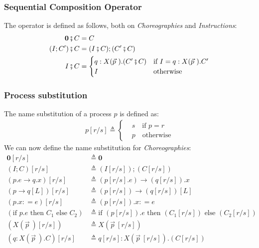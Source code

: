 \documentclass[12pt,a4paper,twoside]{book}
\newcommand{\metaDef}{\mathrel{\mathop:}=}
\newcommand{\gencom}{p.e \rightarrow q.x}
\newcommand{\gensel}{p \rightarrow q[L]}
\begin{document}
\subsubsection{Sequential Composition Operator}
The operator is defined as follows, both on \textit{Choreographies} and \textit{Instructions}:
\begin{align*}
	\boldsymbol{0} \fatsemi C &= C\\
    (I; C') \fatsemi C &= (I \fatsemi C); (C' \fatsemi C)\\
    I \fatsemi C &= 
    \begin{cases}
		q : X(\vec{p}~).(C' \fatsemi C) &\text{if $I = q : X(\vec{p}~).C' $}\\
		I &\text{otherwise}
    \end{cases}
\end{align*}

\subsubsection{Process substitution}
The name substitution of a process $p$ is defined as:
\begin{align*}
    p[r/s] \triangleq
    \begin{cases}
    &s \quad \text{if $p = r$}\\
    &p \quad \text{otherwise}
    \end{cases}
\end{align*}
We can now define the name substitution for \textit{Choreographies}:
\begin{align*}
	\boldsymbol{0}[r/s] &\triangleq \boldsymbol{0}\\
    (I; C)[r/s] &\triangleq (I[r/s]); (C[r/s])\\
    (\gencom)[r/s] &\triangleq (p[r/s].e) \rightarrow (q[r/s]).x\\
    (\gensel)[r/s] &\triangleq (p[r/s]) \rightarrow (q[r/s])[L]\\
    (p.x \metaDef e)[r/s] &\triangleq (p[r/s]).x \metaDef e\\
    (\text{if } p.e\text{ then } C_1\text{ else } C_2) &\triangleq \text{if }(p[r/s]).e \text{ then }(C_1[r/s]) \text{ else } (C_2[r/s])\\
    (X(\vec{p}~)[r/s]) &\triangleq X(\vec{p}~[r/s])\\
	(q : X(\vec{p}~).C) [r/s] &\triangleq q[r/s] : X(\vec{p}~[r/s]).(C[r/s])\\
\end{align*}
\end{document}
